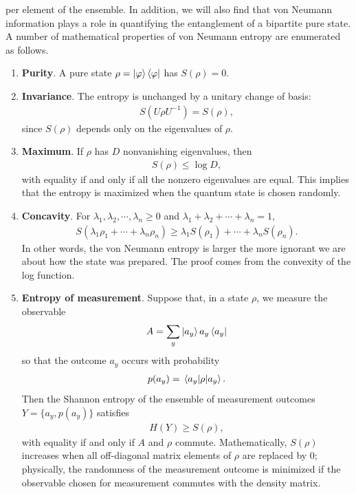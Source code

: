 \documentclass[a4paper, 12pt]{article}
\numberwithin{equation}{section}
\numberwithin{figure}{section}
\theoremstyle{definition}
\begin{document}
    per element of the ensemble. In addition, we will also find that von Neumann information plays a role in quantifying the entanglement of a bipartite pure state. A number of mathematical properties of von Neumann entropy are enumerated as follows.
    \begin{enumerate}[label=\textbf{(\arabic*)}]
        \item
            \textbf{Purity}. A pure state $\rho = \ket{\varphi} \bra{\varphi}$ has $S(\rho) = 0$.

        \item
            \textbf{Invariance}. The entropy is unchanged by a unitary change of basis:
            \begin{align}
                S \left( U \rho U^{-1} \right) = S(\rho),
            \end{align}
            since $S(\rho)$ depends only on the eigenvalues of $\rho$.

        \item
            \textbf{Maximum}. If $\rho$ has $D$ nonvanishing eigenvalues, then
            \begin{align}
                S(\rho) \leq \log D,
            \end{align}
            with equality if and only if all the nonzero eigenvalues are equal. This implies that the entropy is maximized when the quantum state is chosen randomly.

        \item
            \textbf{Concavity}. For $\lambda_1, \lambda_2, \cdots, \lambda_n \geq 0$ and $\lambda_1 + \lambda_2 + \cdots + \lambda_n = 1$,
            \begin{align}
                S(\lambda_1 \rho_1 + \cdots + \lambda_n \rho_n) \geq \lambda_1 S(\rho_1) + \cdots + \lambda_n S(\rho_n).
            \end{align}
            In other words, the von Neumann entropy is larger the more ignorant we are about how the state was prepared. The proof comes from the convexity of the log function.

        \item
            \textbf{Entropy of measurement}. Suppose that, in a state $\rho$, we measure the observable
            \begin{align}
                A = \sum_y \ket{a_y} a_y \bra{a_y}
            \end{align}
            so that the outcome $a_y$ occurs with probability
            \begin{align}
                p(a_y) = \matrixel{a_y}{\rho}{a_y}.
            \end{align}
            Then the Shannon entropy of the ensemble of measurement outcomes $Y = \{ a_y, p(a_y) \}$ satisfies
            \begin{align}
                H(Y) \geq S(\rho),
            \end{align}
            with equality if and only if $A$ and $\rho$ commute. Mathematically, $S(\rho)$ increases when all off-diagonal matrix elements of $\rho$ are replaced by $0$; physically, the randomness of the measurement outcome is minimized if the observable chosen for measurement commutes with the density matrix.


\end{enumerate}
\end{document}

